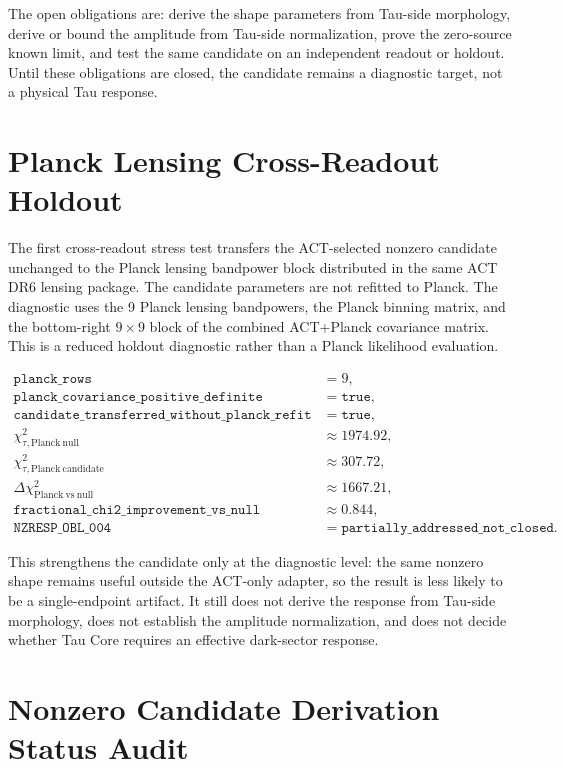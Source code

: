 \documentclass[11pt]{article}
\begin{document}
The open obligations are: derive the shape parameters from Tau-side morphology,
derive or bound the amplitude from Tau-side normalization, prove the zero-source
known limit, and test the same candidate on an independent readout or holdout.
Until these obligations are closed, the candidate remains a diagnostic target,
not a physical Tau response.

\section{Planck Lensing Cross-Readout Holdout}

The first cross-readout stress test transfers the ACT-selected nonzero
candidate unchanged to the Planck lensing bandpower block distributed in the
same ACT DR6 lensing package. The candidate parameters are not refitted to
Planck. The diagnostic uses the 9 Planck lensing bandpowers, the Planck binning
matrix, and the bottom-right \(9\times9\) block of the combined ACT+Planck
covariance matrix. This is a reduced holdout diagnostic rather than a Planck
likelihood evaluation.

\[
\begin{array}{ll}
\texttt{planck\_rows} &= 9,\\
\texttt{planck\_covariance\_positive\_definite} &= \texttt{true},\\
\texttt{candidate\_transferred\_without\_planck\_refit} &= \texttt{true},\\
\chi^2_{\tau,\mathrm{Planck\ null}} &\approx 1974.92,\\
\chi^2_{\tau,\mathrm{Planck\ candidate}} &\approx 307.72,\\
\Delta\chi^2_{\mathrm{Planck\ vs\ null}} &\approx 1667.21,\\
\texttt{fractional\_chi2\_improvement\_vs\_null} &\approx 0.844,\\
\texttt{NZRESP\_OBL\_004} &=
\texttt{partially\_addressed\_not\_closed}.
\end{array}
\]

This strengthens the candidate only at the diagnostic level: the same nonzero
shape remains useful outside the ACT-only adapter, so the result is less likely
to be a single-endpoint artifact. It still does not derive the response from
Tau-side morphology, does not establish the amplitude normalization, and does
not decide whether Tau Core requires an effective dark-sector response.

\section{Nonzero Candidate Derivation Status Audit}
\end{document}
